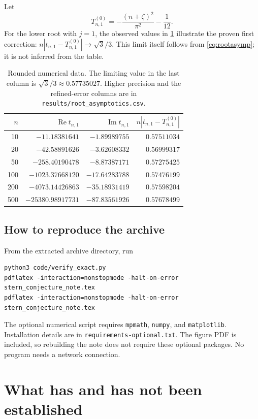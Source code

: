\documentclass[11pt]{article}
\numberwithin{equation}{section}
\theoremstyle{definition}
\newcommand{\Repart}{\operatorname{Re}}
\newcommand{\Impart}{\operatorname{Im}}
\begin{document}
Let
\[
 T_{n,1}^{(0)}=-\frac{(n+\zeta)^2}{\pi^2}-\frac1{12}.
\]
For the lower root with $j=1$, the observed values in \cref{tab:asymptotic}
illustrate the proven first correction:
$n|t_{n,1}-T_{n,1}^{(0)}|\to\sqrt3/3$.
This limit itself follows from \eqref{eq:rootasymp}; it is not inferred
from the table.

\begin{table}[htb]
\centering\small
\begin{tabular}{@{}rrrr@{}}
\toprule
$n$ & $\Repart t_{n,1}$ & $\Impart t_{n,1}$ &
 $n|t_{n,1}-T_{n,1}^{(0)}|$\\
\midrule
10 & $-11.18381641$ & $-1.89989755$ & $0.57511034$\\
20 & $-42.58891626$ & $-3.62608332$ & $0.56999317$\\
50 & $-258.40190478$ & $-8.87387171$ & $0.57275425$\\
100 & $-1023.37668120$ & $-17.64283788$ & $0.57476199$\\
200 & $-4073.14426863$ & $-35.18931419$ & $0.57598204$\\
500 & $-25380.98917731$ & $-87.83561926$ & $0.57678499$\\
\bottomrule
\end{tabular}
\caption{Rounded numerical data.  The limiting value in the last column
is $\sqrt3/3\approx0.57735027$.  Higher precision and the refined-error
columns are in \texttt{results/root\_asymptotics.csv}.}
\label{tab:asymptotic}
\end{table}

\subsection{How to reproduce the archive}

From the extracted archive directory, run
\begin{verbatim}
python3 code/verify_exact.py
pdflatex -interaction=nonstopmode -halt-on-error stern_conjecture_note.tex
pdflatex -interaction=nonstopmode -halt-on-error stern_conjecture_note.tex
\end{verbatim}
The optional numerical script requires \texttt{mpmath}, \texttt{numpy}, and
\texttt{matplotlib}. Installation details are in
\texttt{requirements-optional.txt}.
The figure PDF is included, so rebuilding the note does not require these
optional packages.  No program needs a network connection.

\section{What has and has not been established}\label{sec:limits}
\end{document}
